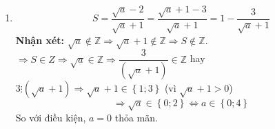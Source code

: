 \begin{bt}
{\begin{enumerate}
\begin{eqnarray*}
			\end{eqnarray*}
			So với điều kiện ta có:
			$$\heva{& \dfrac{2m + 3}{m - 3} \ge 0 \\& \dfrac{2m + 3}{m - 3} \ne 1\\& \dfrac{2m + 3}{m - 3} \ne 2} \Leftrightarrow 
			\heva{& \dfrac{2m + 3}{m - 3} \ge 0 \\& 2m + 3 \ne m - 3 \\& 2m + 3 \ne 2m - 6 } \Leftrightarrow \heva{& \dfrac{2m + 3}{m - 3} \ge 0 \\& m \ne -6 } $$
			Ta có:
			$$ \dfrac{2m + 3}{m - 3} \ge 0 \Leftrightarrow \hoac{& \heva{& 2m + 3 > 0 \\& m - 3 > 0 } \\& \heva{& 2m + 3 \le 0 \\& m - 3 < 0} } \Leftrightarrow \hoac{& m \le  - \dfrac{3}{2}\\& m > 3} $$
			Kết hợp với điều kiện ta có $m > 3$ hoặc $m \le  - \dfrac{3}{2}$ và $m \ne  - 6$ thì phương trình $S \cdot m = 3$ có nghiệm.\\
			\item $$S = \dfrac{\sqrt a  - 2}{\sqrt a  + 1} = \dfrac{\sqrt a  + 1 - 3}{\sqrt a  + 1} = 1 - \dfrac{3}{\sqrt a  + 1}$$
			\textbf{Nhận xét:} $\sqrt a \not \in \mathbb{Z} \Rightarrow \sqrt a  + 1 \not \in \mathbb{Z} \Rightarrow S \not \in \mathbb{Z} $.\\
			$ \Rightarrow S \in Z \Rightarrow \sqrt a  \in \mathbb{Z} \Rightarrow \dfrac{3}{\left( \sqrt a  + 1 \right)} \in \mathbb{Z} $ hay $3 \vdots \left( \sqrt a  + 1 \right) \Rightarrow \sqrt a  + 1 \in \left\{ {1;3} \right\}$ (vì $\sqrt a  + 1 > 0$)
			$$ \Rightarrow \sqrt a  \in \left\{ {0;2} \right\} \Leftrightarrow a \in \left\{ {0;4} \right\}$$
			So với điều kiện, $a = 0$ thỏa mãn.
		\end{enumerate}
	}
\end{bt}

